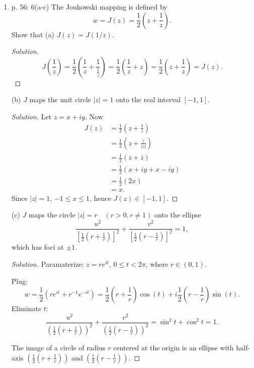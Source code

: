 
\begin{enumerate}
	\item p. 56: 6(a-c) The Joukowski mapping is defined by
\[
w=J(z)=\frac{1}{2}\left(z+\frac{1}{z}\right) .
\]
Show that
(a) $J(z)=J(1 / z)$.
\begin{proof}[Solution]
	\[
		J(\frac{1}{z}) = \frac{1}{2}\left( \frac{1}{z} + \frac{1}{\frac{1}{z}} \right) =\frac{1}{2}\left( \frac{1}{z} + z \right)  = \frac{1}{2} (z + \frac{1}{z}) = J(z)
	.\] 
\end{proof}

(b) $J$ maps the unit circle $|z|=1$ onto the real interval $[-1,1]$.
\begin{proof}[Solution]
	Let $z = x + iy$. Now
	\begin{align*}
		J(z) &= \frac{1}{2}\left(z + \frac{1}{z}\right) \\
		&= \frac{1}{2}\left(z + \frac{\overline{z} }{|z| } \right)\\
		&= \frac{1}{2}\left(z + \overline{z}\right) \\
		&= \frac{1}{2}\left(x+iy + x - iy\right) \\
		&= \frac{1}{2}\left(2x\right) \\
		&= x
	.\end{align*}
	Since $|z| = 1$, $-1\le x\le 1$, hence $J(z) \in [-1,1]$.
\end{proof}

(c) $J$ maps the circle $|z|=r \quad(r>0, r \neq 1)$ onto the ellipse
\[
\frac{u^2}{\left[\frac{1}{2}\left(r+\frac{1}{r}\right)\right]^2}+\frac{v^2}{\left[\frac{1}{2}\left(r-\frac{1}{r}\right)\right]^2}=1,
\]
which has foci at $\pm 1$.
\begin{proof}[Solution]
		Paramaterize: $z = r e^{it}$, $0\le t< 2\pi$, where $r \in (0,1)$. 

		Plug: \[
		w = \frac{1}{2}\left( r e^{it }+r^{-1}e^{-it} \right) 
		= \frac{1}{2}\left( r + \frac{1}{r} \right) \cos(t) + i \frac{1}{2} (r - \frac{1}{r}) \sin(t).
	\]
	Eliminate $t$:
	\[
	\frac{u^2}{\left(\frac{1}{2} \left( r + \frac{1}{r} \right)  \right) ^2} 
	+ \frac{v^2}{\left(\frac{1}{2} \left( r - \frac{1}{r} \right)  \right) ^2} = \sin^2 t + \cos^2 t = 1
	.\] 

	The image of a circle of radius $r$ centered at the origin is an ellipse with half-axis $\left(\frac{1}{2} \left( r + \frac{1}{r} \right)  \right) $ and $\left(\frac{1}{2} \left( r - \frac{1}{r} \right)  \right)$.



\end{proof}
\end{enumerate}
